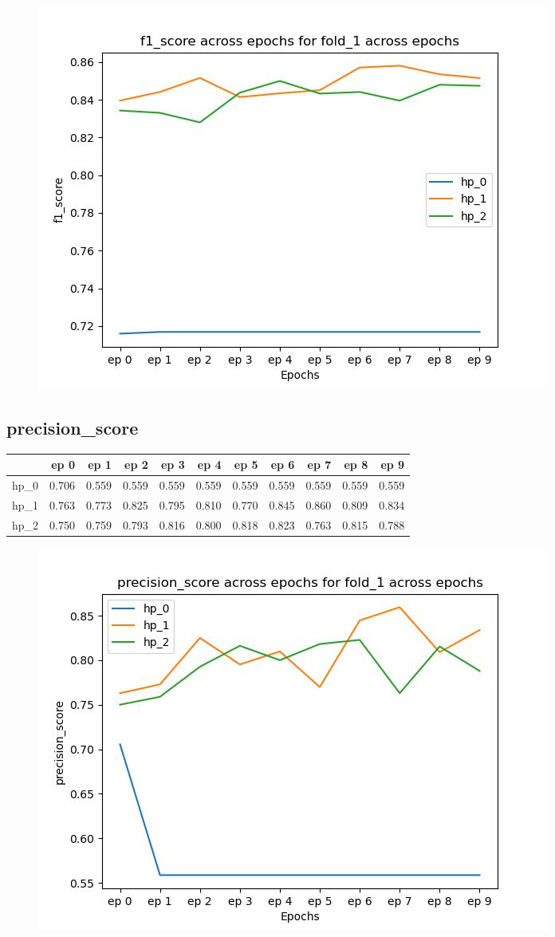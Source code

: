 \documentclass{article}
\begin{document}
\begin{figure}[H]
\includegraphics[scale = 0.75]{fold_1/f1_score}
\end{figure}
\subsection{precision\_score}
\begin{tabular}{lrrrrrrrrrr}
\toprule
{} &   ep 0 &   ep 1 &   ep 2 &   ep 3 &   ep 4 &   ep 5 &   ep 6 &   ep 7 &   ep 8 &   ep 9 \\
\midrule
hp\_0 &  0.706 &  0.559 &  0.559 &  0.559 &  0.559 &  0.559 &  0.559 &  0.559 &  0.559 &  0.559 \\
hp\_1 &  0.763 &  0.773 &  0.825 &  0.795 &  0.810 &  0.770 &  0.845 &  0.860 &  0.809 &  0.834 \\
hp\_2 &  0.750 &  0.759 &  0.793 &  0.816 &  0.800 &  0.818 &  0.823 &  0.763 &  0.815 &  0.788 \\
\bottomrule
\end{tabular}

\begin{figure}[H]
\includegraphics[scale = 0.75]{fold_1/precision_score}
\end{figure}
\end{document}
